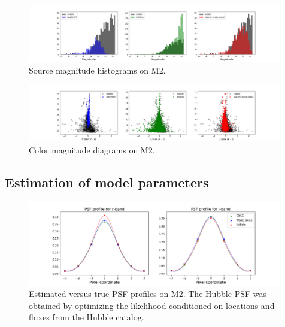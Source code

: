 \begin{figure}[h]
    \centering
    \includegraphics[width=0.99\textwidth]{figures/luminosity_fun.png}
    \caption{Source magnitude histograms on M2. }
    \label{fig:luminosity_fun_m2}
\end{figure}

\begin{figure}[h]
    \centering
    \includegraphics[width=0.99\textwidth]{figures/cmd.png}
    \caption{Color magnitude diagrams on M2. }
    \label{fig:cmd_m2}
\end{figure}


\subsection{Estimation of model parameters}


\begin{figure}[h]
    \centering
    \includegraphics[width=0.99\textwidth]{figures/psf_profiles.png}
    \caption{Estimated versus true PSF profiles on M2. The Hubble PSF was
    obtained by optimizing the likelihood conditioned on locations and fluxes
    from the Hubble catalog. }
    \label{fig:psf_profiles}
\end{figure}



